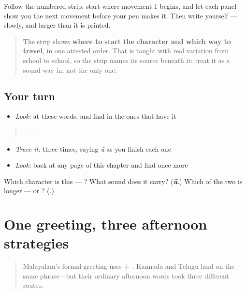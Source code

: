 Follow the numbered strip: start where movement 1 begins, and let each panel show you the next movement before your pen makes it. Then write  yourself — slowly, and larger than it is printed.

\begin{quote}
The strip shows \textbf{where to start the character and which way to travel}, in one attested order. That is taught with real variation from school to school, so the strip names its source beneath it: treat it as a sound way in, not the only one.
\end{quote}

\subsection*{Your turn}
\begin{itemize}
\raggedright
  \item \emph{Look:} at these words, and find  in the ones that have it
\end{itemize}

\begin{quote}
  ·    ·  
\end{quote}

\begin{itemize}
\raggedright
  \item \emph{Trace it:}  three times, saying \emph{ū} as you finish each one
  \item \emph{Look:} back at any page of this chapter and find  once more
\end{itemize}

\begin{tcolorbox}[breakable,colback=teal!4,colframe=teal!35!black,title={Before you move on}]
Which character is this — ? What sound does it carry? (\emph{\textbf{ū}}.) Which of the two is longer —  or ? (.)
\end{tcolorbox}
\section[\texorpdfstring{\ml{ശുഭ} \ml{മധ്യാഹ്നം} … (śubha madhyāhnaṁ …)}{ശുഭ മധ്യാഹ്നം … (śubha madhyāhnaṁ …)}]{One greeting, three afternoon strategies}

\label{lesson:ML-C31-afternoon-convergence}



\begin{quote}
Malayalam’s formal greeting uses \textbf{ + }. Kannada and Telugu land on the same phrase—but their ordinary afternoon words took three different routes.
\end{quote}

